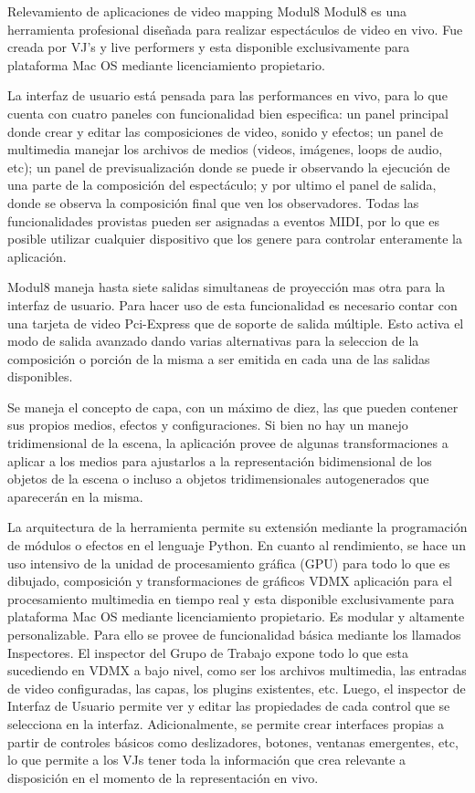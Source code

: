 Relevamiento de aplicaciones de video mapping
Modul8
Modul8 es una herramienta profesional diseñada para realizar espectáculos de video en vivo. Fue creada por VJ's y live performers y esta disponible exclusivamente para plataforma Mac OS mediante licenciamiento propietario.

La interfaz de usuario está pensada para las performances en vivo, para lo que cuenta con cuatro paneles con funcionalidad bien especifica: un panel principal donde crear y editar las composiciones de video, sonido y efectos; un panel de multimedia manejar los archivos de medios (videos, imágenes, loops de audio, etc); un panel de previsualización donde se puede ir observando la ejecución de una parte de la composición del espectáculo; y por ultimo el panel de salida, donde se observa la composición final que ven los observadores. Todas las funcionalidades provistas pueden ser asignadas a eventos MIDI, por lo que es posible utilizar cualquier dispositivo que los genere para controlar enteramente la aplicación.

Modul8 maneja hasta siete salidas simultaneas de proyección mas otra para la interfaz de usuario. Para hacer uso de esta funcionalidad es necesario contar con una tarjeta de video Pci-Express que de soporte de salida múltiple. Esto activa el modo de salida avanzado dando varias alternativas para la seleccion de la composición o porción de la misma a ser emitida en cada una de las salidas disponibles.

Se maneja el concepto de capa, con un máximo de diez, las que pueden contener sus propios medios, efectos y configuraciones.
Si bien no hay un manejo tridimensional de la escena, la aplicación provee de algunas transformaciones a aplicar a los medios para ajustarlos a la representación bidimensional de los objetos de la escena o incluso a objetos tridimensionales autogenerados que aparecerán en la misma.

La arquitectura de la herramienta permite su extensión mediante la programación de módulos o efectos en el lenguaje Python. En cuanto al rendimiento, se hace un uso intensivo de la unidad de procesamiento gráfica (GPU) para todo lo que es dibujado, composición y transformaciones de gráficos
VDMX
aplicación para el procesamiento multimedia en tiempo real y esta disponible exclusivamente para plataforma Mac OS mediante licenciamiento propietario. Es modular y altamente personalizable. Para ello se provee de funcionalidad básica mediante los llamados Inspectores. El inspector del Grupo de Trabajo expone todo lo que esta sucediendo en VDMX a bajo nivel, como ser los archivos multimedia, las entradas de video configuradas, las capas, los plugins existentes, etc. Luego, el inspector de Interfaz de Usuario permite ver y editar las propiedades de cada control que se selecciona en la interfaz. Adicionalmente, se permite crear interfaces propias a partir de controles básicos como deslizadores, botones, ventanas emergentes, etc, lo que permite a los VJs tener toda la información que crea relevante a disposición en el momento de la representación en vivo.


